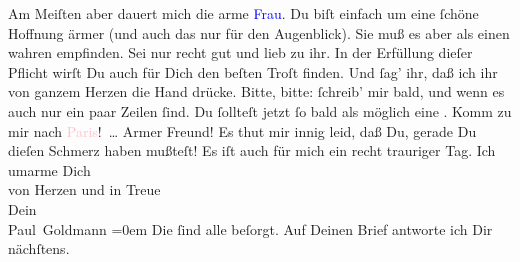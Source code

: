            \pstart
           Am Meiſten aber dauert mich die arme \textcolor{blue}{Frau}{}. Du biſt {\pb}einfach um
               eine ſchöne Hoffnung ärmer (und auch das nur für den Augenblick). Sie muß es aber als
               einen wahren \label{K_L02826-5v}\label{K_L02826-5h} empfinden. Sei nur
               recht gut und lieb zu ihr. In der Erfüllung dieſer Pflicht wirſt Du auch für Dich den
               beſten Troſt finden. Und ſag’ ihr, daß ich ihr von ganzem Herzen die Hand drücke.\pend
           \pstart
           Bitte, bitte: ſchreib’ mir bald, und wenn es auch nur ein paar Zeilen ſind.\pend
           \pstart
           Du ſollteſt jetzt ſo bald als möglich eine \label{K_L02826-6v}\label{K_L02826-6h}. Komm zu mir nach \textcolor{pink}{Paris}{}\ledrightnote{\textcolor{pink}{Paris}}! {\dots}\pend
           \pstart
           Armer Freund! Es thut mir innig leid, daß Du, gerade Du dieſen Schmerz {\pb}haben mußteſt! Es iſt auch für mich ein recht
               trauriger Tag.\pend
           \pstart
           Ich umarme Dich {\\[\baselineskip]}von Herzen und in Treue {\\[\baselineskip]}Dein {\\[\baselineskip]}\spacefill\mbox{Paul Goldmann}\pend
           \leftskip=0em{}\pstart
           \noindent{}Die \label{K_L02826-8v}\label{K_L02826-8h} ſind alle beſorgt. Auf Deinen Brief
                  antworte ich Dir nächſtens.\pend
           \endnumbering{}\begin{anhang}\end{anhang}
      